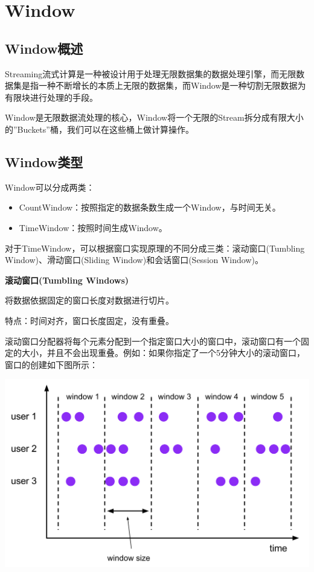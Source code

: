 \documentclass[oneside]{ctexbook}
\begin{document}
\section{Window}

\subsection{Window概述}

Streaming流式计算是一种被设计用于处理无限数据集的数据处理引擎，而无限数据集是指一种不断增长的本质上无限的数据集，而Window是一种切割无限数据为有限块进行处理的手段。

Window是无限数据流处理的核心，Window将一个无限的Stream拆分成有限大小的”Buckets”桶，我们可以在这些桶上做计算操作。

\subsection{Window类型}

Window可以分成两类：

\begin{itemize}
\item CountWindow：按照指定的数据条数生成一个Window，与时间无关。
\item TimeWindow：按照时间生成Window。
\end{itemize}

对于TimeWindow，可以根据窗口实现原理的不同分成三类：滚动窗口(Tumbling Window)、滑动窗口(Sliding Window)和会话窗口(Session Window)。

\textbf{滚动窗口(Tumbling Windows)}

将数据依据固定的窗口长度对数据进行切片。

特点：时间对齐，窗口长度固定，没有重叠。

滚动窗口分配器将每个元素分配到一个指定窗口大小的窗口中，滚动窗口有一个固定的大小，并且不会出现重叠。例如：如果你指定了一个5分钟大小的滚动窗口，窗口的创建如下图所示：

\noindent \includegraphics[width=\textwidth]{tumbling-windows.png}
\end{document}
